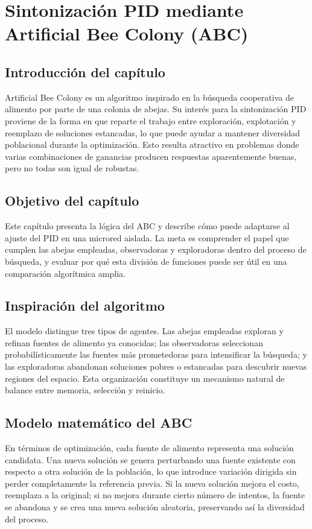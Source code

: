 \chapter{Sintonización PID mediante Artificial Bee Colony (ABC)}
\label{ch:abc}

\section{Introducción del capítulo}
Artificial Bee Colony es un algoritmo inspirado en la búsqueda cooperativa de alimento por
parte de una colonia de abejas. Su interés para la sintonización PID proviene de la forma en
que reparte el trabajo entre exploración, explotación y reemplazo de soluciones estancadas,
lo que puede ayudar a mantener diversidad poblacional durante la optimización. Esto resulta
atractivo en problemas donde varias combinaciones de ganancias producen respuestas
aparentemente buenas, pero no todas son igual de robustas.

\section{Objetivo del capítulo}
Este capítulo presenta la lógica del ABC y describe cómo puede adaptarse al ajuste del PID en
una microred aislada. La meta es comprender el papel que cumplen las abejas empleadas,
observadoras y exploradoras dentro del proceso de búsqueda, y evaluar por qué esta división
de funciones puede ser útil en una comparación algorítmica amplia.

\section{Inspiración del algoritmo}
El modelo distingue tres tipos de agentes. Las abejas empleadas exploran y refinan fuentes de
alimento ya conocidas; las observadoras seleccionan probabilísticamente las fuentes más
prometedoras para intensificar la búsqueda; y las exploradoras abandonan soluciones pobres o
estancadas para descubrir nuevas regiones del espacio. Esta organización constituye un
mecanismo natural de balance entre memoria, selección y reinicio.

\section{Modelo matemático del ABC}
En términos de optimización, cada fuente de alimento representa una solución candidata. Una
nueva solución se genera perturbando una fuente existente con respecto a otra solución de la
población, lo que introduce variación dirigida sin perder completamente la referencia previa.
Si la nueva solución mejora el costo, reemplaza a la original; si no mejora durante cierto número
de intentos, la fuente se abandona y se crea una nueva solución aleatoria, preservando así la
diversidad del proceso.

